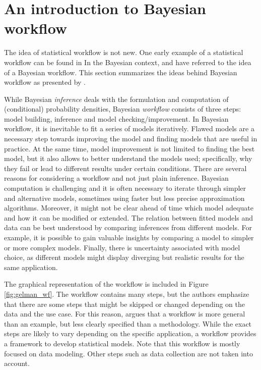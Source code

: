\section{An introduction to Bayesian workflow}

The idea of statistical workflow is not new.
One early example of a statistical workflow can be found in%
In the Bayesian context, \cite{gabry_visualization_2019} and \cite{betancourt_towards_2020} have referred to the idea of a Bayesian workflow.
This section summarizes the ideas behind Bayesian workflow as presented by \cite{gelman_bayesian_2020}.

While Bayesian \textit{inference} deals with the formulation and computation of (conditional) probability densities, Bayesian \textit{workflow} consists of three steps: model building, inference and model checking/improvement.
In Bayesian workflow, it is inevitable to fit a series of models iteratively.
Flawed models are a necessary step towards improving the model and finding models that are useful in practice.
At the same time, model improvement is not limited to finding the best model, but it also allows to better understand the models used; specifically, why they fail or lead to different results under certain conditions.
There are several reasons for considering a workflow and not just plain inference.
Bayesian computation is challenging and it is often necessary to iterate through simpler and alternative models, sometimes using faster but less precise approximation algorithms.
Moreover, it might not be clear ahead of time which model adequate and how it can be modified or extended.
The relation between fitted models and data can be best understood by comparing inferences from different models.
For example, it is possible to gain valuable insights by comparing a model to simpler or more complex models.
Finally, there is uncertainty associated with model choice, as different models might display diverging but realistic results for the same application.

The graphical representation of the workflow is included in Figure \ref{fig:gelman_wf}.
The workflow contains many steps, but the authors emphasize that there are some steps that might be skipped or changed depending on the data and the use case.
For this reason, \cite{gelman_bayesian_2020} argues that a workflow is more general than an example, but less clearly specified than a methodology.
While the exact steps are likely to vary depending on the specific application, a workflow provides a framework to develop statistical models.
Note that this workflow is mostly focused on data modeling.
Other steps such as data collection are not taken into account.

